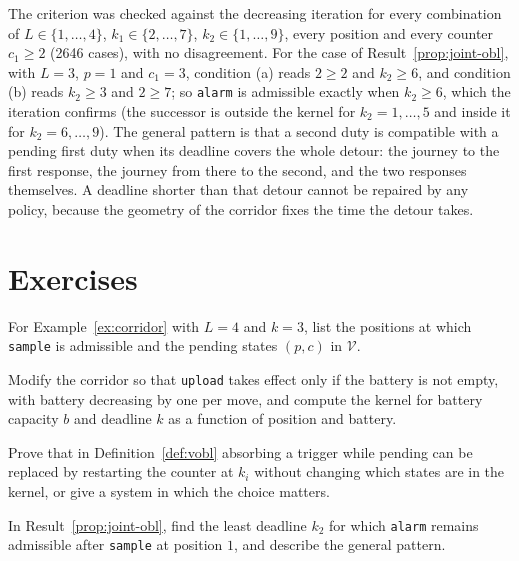 The criterion was checked against the decreasing iteration for every combination of $L\in\{1,\dots,4\}$, $k_1\in\{2,\dots,7\}$, $k_2\in\{1,\dots,9\}$, every position and every counter $c_1\ge2$ (2646 cases), with no disagreement. For the case of Result~\ref{prop:joint-obl}, with $L=3$, $p=1$ and $c_1=3$, condition (a) reads $2\ge2$ and $k_2\ge6$, and condition (b) reads $k_2\ge3$ and $2\ge7$; so \texttt{alarm} is admissible exactly when $k_2\ge6$, which the iteration confirms (the successor is outside the kernel for $k_2=1,\dots,5$ and inside it for $k_2=6,\dots,9$). The general pattern is that a second duty is compatible with a pending first duty when its deadline covers the whole detour: the journey to the first response, the journey from there to the second, and the two responses themselves. A deadline shorter than that detour cannot be repaired by any policy, because the geometry of the corridor fixes the time the detour takes.

\section*{Exercises}

\begin{exercise}
For Example~\ref{ex:corridor} with $L=4$ and $k=3$, list the positions at which \texttt{sample} is admissible and the pending states $(p,c)$ in $\mathcal V$.\label{ex2:corridor-4}
\end{exercise}

\begin{exercise}
Modify the corridor so that \texttt{upload} takes effect only if the battery is not empty, with battery decreasing by one per move, and compute the kernel for battery capacity $b$ and deadline $k$ as a function of position and battery.
\end{exercise}

\begin{exercise}
Prove that in Definition~\ref{def:vobl} absorbing a trigger while pending can be replaced by restarting the counter at $k_i$ without changing which states are in the kernel, or give a system in which the choice matters.
\end{exercise}

\begin{exercise}
In Result~\ref{prop:joint-obl}, find the least deadline $k_2$ for which \texttt{alarm} remains admissible after \texttt{sample} at position $1$, and describe the general pattern.\label{ex2:least-k2}
\end{exercise}

